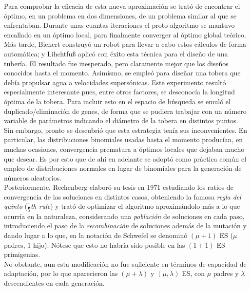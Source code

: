 \documentclass[12pt]{article} \usepackage[utf8x]{inputenc}
\begin{document}
Para comprobar la eficacia de esta nueva aproximación se trató de
encontrar el óptimo, en un problema en dos dimensiones, de un problema
similar al que se enfrentaban. Durante unas cuantas iteraciones el
proto-algoritmo se mantuvo encallado en un óptimo local, para
finalmente converger al óptimo global teórico. \\

Más tarde, Bienert construyó un robot para llevar a cabo estos
cálculos de forma automática; y Lihchtfu{\ss} aplicó con éxito esta técnica para
el diseño de una tubería. El resultado fue inesperado, pero claramente
mejor que los diseños conocidos hasta el momento. Asimismo, se empleó
para diseñar una tobera que debía propulsar agua a velocidades
supersónicas. Este experimento resultó especialmente interesante pues,
entre otros factores, se desconocía la longitud óptima de la
tobera. Para incluir esto en el espacio de búsqueda se emuló el
duplicado/eliminación de genes, de forma que se pudiera trabajar con un número
variable de parámetros indicando el diámetro de la tobera en distintos
puntos. \\

Sin embargo, pronto se descubrió que esta estrategia tenía sus
inconvenientes. En particular, las distribuciones binomiales usadas
hasta el momento producían, en muchas ocasiones, convergencia
prematura a óptimos locales que dejaban mucho que desear. Es por esto
que de ahí en adelante se adoptó como práctica común el empleo de
distribuciones normales en lugar de binomiales para la generación de
números aleatorios. \\

Posteriormente, Rechenberg elaboró su tesis en 1971 estudiando los
ratios de convergencia de las soluciones en distintos casos,
obteniendo la famosa \textit{regla del quinto} (\textit{$\frac 1 5$th
  rule}) y trató de optimizar el algoritmo aproximándolo más a lo que
ocurría en la naturaleza, considerando una \textit{población} de
soluciones en cada paso, introduciendo el paso de la
\textit{recombinación} de soluciones además de la mutación y dando
lugar a lo que, en la notación de Schwefel se denominó $(\mu + 1)$ ES
($\mu$ padres, $1$ hijo). Nótese que esto no habría sido posible en
las $(1 + 1)$ ES primigenias. \\

No obstante, aun esta modificación no fue suficiente en términos de
capacidad de adaptación, por lo que aparecieron las $(\mu + \lambda)$
y $(\mu, \lambda)$ ES, con $\mu$ padres y $\lambda$ descendientes en
cada generación. \\
\end{document}

